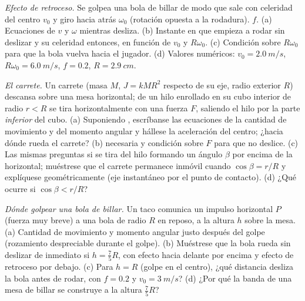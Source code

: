 \begin{exercise}[$\star\star$]\label{exo:b2:rigid-body-mechanics:9}
\emph{Efecto de retroceso.} Se golpea una bola de billar de modo que sale
con celeridad del centro $v_0$ y giro hacia atrás $\omega_0$ (rotación
opuesta a la rodadura).  $f$. (a) Ecuaciones de
$v$ y $\omega$ mientras desliza. (b) Instante en que empieza a rodar sin
deslizar y su celeridad entonces, en función de $v_0$ y $R\omega_0$.
(c) Condición sobre $R\omega_0$ para que la bola vuelva hacia el jugador.
(d) Valores numéricos: $v_0 = \qty{2.0}{m/s}$, $R\omega_0 = \qty{6.0}{m/s}$, $f = 0.2$,
$R = \qty{2.9}{cm}$.
\end{exercise}

\begin{exercise}[$\star\star\star$]\label{exo:b2:rigid-body-mechanics:10}
\emph{El carrete.} Un carrete (masa $M$,  $J = kMR^2$
respecto de su eje, radio exterior $R$) descansa sobre una mesa
horizontal; de un hilo enrollado en su cubo interior de radio $r < R$ se
tira horizontalmente con una fuerza $F$, saliendo el hilo por la parte
\emph{inferior} del cubo. (a) Suponiendo ,
escríbanse las ecuaciones de la cantidad de movimiento y del momento
angular y hállese la aceleración del centro; ¿hacia dónde rueda el
carrete? (b)  necesaria y condición sobre $F$ para que
no deslice. (c) Las mismas preguntas si se tira del hilo formando un
ángulo $\beta$ por encima de la horizontal; muéstrese que el carrete
permanece inmóvil cuando $\cos\beta = r/R$ y explíquese geométricamente
(eje instantáneo por el punto de contacto). (d) ¿Qué ocurre si $\cos\beta < r/R$?
\end{exercise}

\begin{exercise}[$\star\star\star$]\label{exo:b2:rigid-body-mechanics:11}
\emph{Dónde golpear una bola de billar.} Un taco comunica un impulso
horizontal $P$ (fuerza muy breve) a una bola de radio $R$ en reposo, a la
altura $h$ sobre la mesa. (a) Cantidad de movimiento y momento angular
justo después del golpe (rozamiento despreciable durante el golpe).
(b) Muéstrese que la bola rueda sin deslizar de inmediato si
$h = \tfrac75R$, con efecto hacia delante por encima y efecto de retroceso
por debajo. (c) Para $h = R$ (golpe en el centro), ¿qué distancia desliza
la bola antes de rodar, con $f = 0.2$ y $v_0 = \qty{3}{m/s}$? (d) ¿Por qué
la banda de una mesa de billar se construye a la altura $\tfrac75R$?
\end{exercise}

